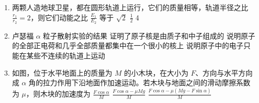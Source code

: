 \documentclass[\gkver]{gaokaozhenti}
\begin{document}
\begin{enumerate}
{

如果波传播方向为从 b 向 a，则如图所示，b 经过平衡位置向下运动，故 C 仍正确。

}

\item
两颗人造地球卫星，都在圆形轨道上运行，它们的质量相等，轨道半径之比 $\frac{r_{1}}{r_{2}} = 2$，则它们动能之比 $\frac{E_{1}}{E_{2}}$ 等于
{$\sqrt{2}$}
{$\frac{1}{2}$}
{4}


\item
卢瑟福 $\alpha$ 粒子散射实验的结果
{证明了原子核是由质子和中子组成的}
{说明原子的全部正电荷和几乎全部质量都集中在一个很小的核上}
{说明原子中的电子只能在某些不连续的轨道上运动}


\item
如图，位于水平地面上的质量为 $M$ 的小木块，在大小为 $F$、方向与水平方向成 $\alpha$ 角的拉力作用下沿地面作加速运动。若木块与地面之间的滑动摩擦系数为 $\mu$，则木块的加速度为
{$\frac{F\cos \alpha }{M}$}
{$\frac{F\cos \alpha  - \mu Mg}{M}$}
{$\frac{F\cos \alpha  - \mu (Mg - F\sin \alpha )}{M}$}


\end{enumerate}
\end{document}
